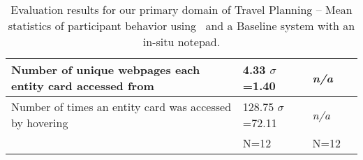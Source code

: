 \begin{table}
\begin{tabular}{p{}  p{} p{} p{}}
	Number of unique webpages each entity card accessed from &
    4.33 \newline $\sigma$=1.40 &
    \textit{n/a} &
    \\
    
    \hline
    
	Number of times an entity card was accessed by hovering &
    128.75 \newline $\sigma$=72.11 &
    \textit{n/a} &
    \\
	
	\arrayrulecolor{black}\hline
	
	&
    N=12 &
    N=12 &
    \\
	
  \end{tabular}
  \caption{Evaluation results for our primary domain of Travel Planning -- Mean statistics of participant behavior using \SYSTEM~and a Baseline system with an in-situ notepad.}
  \label{tab:results_main}
\end{table}